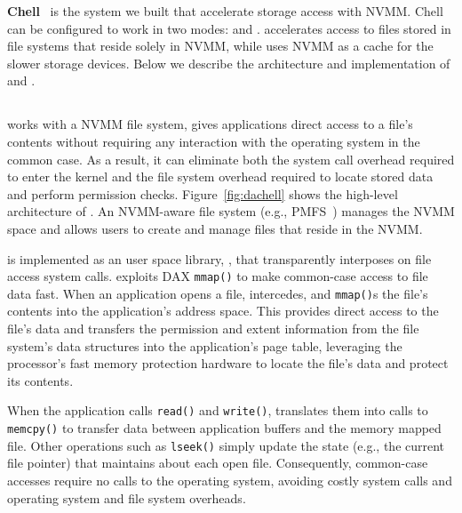 \textbf{Chell}~\cite{Chell} is the system we built that accelerate storage
access with NVMM. Chell can be configured to work in two modes: \DAChell{}
and \CChell{}. \DAChell{} accelerates access to files stored in file systems
that reside solely in NVMM, while \CChell{} uses NVMM as a cache for the
slower storage devices. Below we describe the architecture and implementation
of \DAChell{} and \CChell{}.

\subsection{\DAChell{}}



\DAChell{} works with a NVMM file system, gives applications direct access to
a file's contents without
requiring any interaction with the operating system in the common case.  As a
result, it can eliminate both the system call overhead required to enter the
kernel and the file system overhead required to locate stored data and perform
permission checks.
Figure~\ref{fig:dachell} shows the high-level architecture of
\DAChell{}. An NVMM-aware file system (e.g.,
PMFS~\cite{PMFS}) manages the NVMM space and allows users to create and manage
files that reside in the NVMM.

\DAChell{} is implemented as an user space library, \libd{}, that transparently interposes on file access system calls.
\DAChell{} exploits DAX \texttt{mmap()} to make common-case access to file data
fast.  When an application opens a file, \DAChell{} intercedes, and
\texttt{mmap()}s the file's contents into the application's address space.
This provides direct access to the file's data and transfers the permission and
extent information from the file system's data structures into the
application's page table, leveraging the processor's fast memory
protection hardware to locate the file's data and protect its contents.

When the application calls \texttt{read()} and \texttt{write()}, \DAChell{}
translates them into calls to \texttt{memcpy()} to transfer data between
application buffers and the memory mapped file.  Other operations such as
\texttt{lseek()} simply update the state (e.g., the current file pointer) that
\DAChell{} maintains about each open file.  Consequently, common-case accesses
require no calls to the operating system, avoiding costly system calls and 
operating system and file system overheads.

